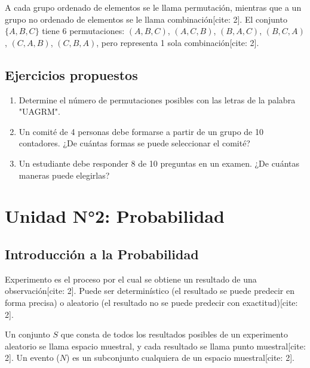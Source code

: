 \documentclass[12pt,a4paper]{book}
\begin{document}
\begin{ejemplo}
A cada grupo ordenado de elementos se le llama permutación, mientras que a un grupo no ordenado de elementos se le llama combinación[cite: 2].
El conjunto $\{A, B, C\}$ tiene 6 permutaciones: $(A,B,C)$, $(A,C,B)$, $(B,A,C)$, $(B,C,A)$, $(C,A,B)$, $(C,B,A)$, pero representa 1 sola combinación[cite: 2].
\end{ejemplo}

\section{Ejercicios propuestos}
\begin{enumerate}
    \item Determine el número de permutaciones posibles con las letras de la palabra "UAGRM".
    \item Un comité de 4 personas debe formarse a partir de un grupo de 10 contadores. ¿De cuántas formas se puede seleccionar el comité?
    \item Un estudiante debe responder 8 de 10 preguntas en un examen. ¿De cuántas maneras puede elegirlas?
\end{enumerate}

\chapter{Unidad N°2: Probabilidad}

\section{Introducción a la Probabilidad}
Experimento es el proceso por el cual se obtiene un resultado de una observación[cite: 2]. Puede ser determinístico (el resultado se puede predecir en forma precisa) o aleatorio (el resultado no se puede predecir con exactitud)[cite: 2].

\begin{definicion}
Un conjunto $S$ que consta de todos los resultados posibles de un experimento aleatorio se llama espacio muestral, y cada resultado se llama punto muestral[cite: 2]. Un evento ($N$) es un subconjunto cualquiera de un espacio muestral[cite: 2].
\end{definicion}
\end{document}
